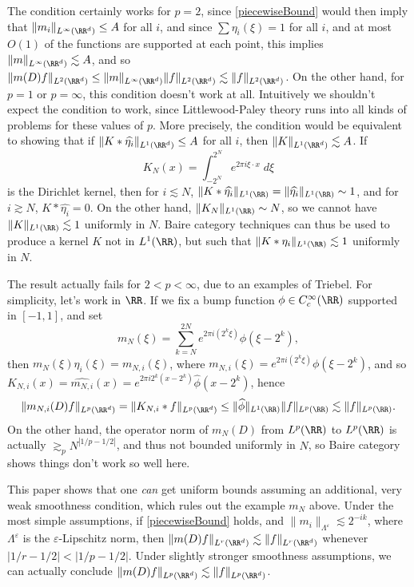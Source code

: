 The condition certainly works for $p = 2$, since \eqref{piecewiseBound} would then imply that $\| m_i \|_{L^\infty(\RR^d)} \leq A$ for all $i$, and since $\sum \eta_i(\xi) = 1$ for all $i$, and at most $O(1)$ of the functions are supported at each point, this implies $\| m \|_{L^\infty(\RR^d)} \lesssim A$, and so $\| m(D) f \|_{L^2(\RR^d)} \leq \| m \|_{L^\infty(\RR^d)} \| f \|_{L^2(\RR^d)} \lesssim \| f \|_{L^2(\RR^d)}$. On the other hand, for $p = 1$ or $p = \infty$, this condition doesn't work at all. Intuitively we shouldn't expect the condition to work, since Littlewood-Paley theory runs into all kinds of problems for these values of $p$. More precisely, the condition would be equivalent to showing that if $\| K * \widehat{\eta_i} \|_{L^1(\RR^d)} \leq A$ for all $i$, then $\| K \|_{L^1(\RR^d)} \lesssim A$. If
%
\[ K_N(x) = \int_{-2^N}^{2^N} e^{2 \pi i \xi \cdot x}\; d\xi \]
%
is the Dirichlet kernel, then for $i \lesssim N$, $\| K * \widehat{\eta_i} \|_{L^1(\RR)} = \| \widehat{\eta_i} \|_{L^1(\RR)} \sim 1$, and for $i \gtrsim N$, $K * \widehat{\eta_i} = 0$. On the other hand, $\| K_N \|_{L^1(\RR)} \sim N$, so we cannot have $\| K \|_{L^1(\RR)} \lesssim 1$ uniformly in $N$. Baire category techniques can thus be used to produce a kernel $K$ not in $L^1(\RR)$, but such that $\| K * \eta_i \|_{L^1(\RR)} \lesssim 1$ uniformly in $N$.

The result actually fails for $2 < p < \infty$, due to an examples of Triebel. For simplicity, let's work in $\RR$. If we fix a bump function $\phi \in C_c^\infty(\RR)$ supported in $[-1,1]$, and set
%
\[ m_N(\xi) = \sum_{k = N}^{2N} e^{2 \pi i (2^k \xi)} \phi(\xi - 2^k), \]
%
then $m_N(\xi) \eta_i(\xi) = m_{N,i}(\xi)$, where $m_{N,i}(\xi) = e^{2 \pi i (2^k \xi)} \phi(\xi - 2^k)$, and so $K_{N,i}(x) = \widehat{m_{N,i}}(x) = e^{2 \pi i 2^k(x - 2^k)} \widehat{\phi}(x - 2^k)$, hence
%
\[ \| m_{N,i}(D) f \|_{L^p(\RR^d)} = \| K_{N,i} * f \|_{L^p(\RR^d)} \leq \| \widehat{\phi} \|_{L^1(\RR)} \| f \|_{L^p(\RR)} \lesssim \| f \|_{L^p(\RR)}. \]
%
On the other hand, the operator norm of $m_N(D)$ from $L^p(\RR)$ to $L^p(\RR)$ is actually $\gtrsim_p N^{|1/p - 1/2|}$, and thus not bounded uniformly in $N$, so Baire category shows things don't work so well here.

This paper shows that one \emph{can} get uniform bounds assuming an additional, very weak smoothness condition, which rules out the example $m_N$ above. Under the most simple assumptions, if \eqref{piecewiseBound} holds, and $\| m_i \|_{\Lambda^\varepsilon} \lesssim 2^{-ik}$, where $\Lambda^\varepsilon$ is the $\varepsilon$-Lipschitz norm, then $\| m(D) f \|_{L^r(\RR^d)} \lesssim \| f \|_{L^r(\RR^d)}$ whenever $|1/r - 1/2| < |1/p - 1/2|$. Under slightly stronger smoothness assumptions, we can actually conclude $\| m(D) f \|_{L^p(\RR^d)} \lesssim \| f \|_{L^p(\RR^d)}$.

